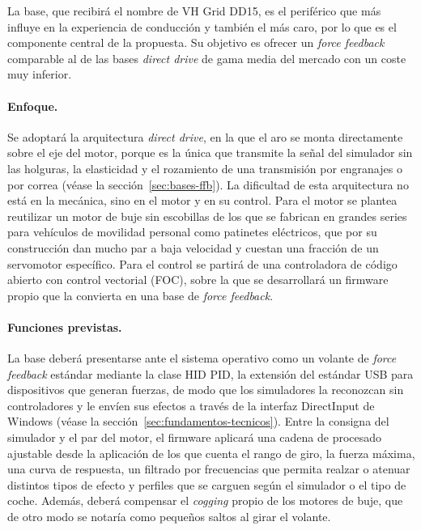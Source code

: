 La base, que recibirá el nombre de VH Grid DD15, es el periférico que más influye en la experiencia de conducción y también el más caro, por lo que es el componente central de la propuesta. Su objetivo es ofrecer un \textit{force feedback} comparable al de las bases \textit{direct drive} de gama media del mercado con un coste muy inferior.

\paragraph{Enfoque.}
Se adoptará la arquitectura \textit{direct drive}, en la que el aro se monta directamente sobre el eje del motor, porque es la única que transmite la señal del simulador sin las holguras, la elasticidad y el rozamiento de una transmisión por engranajes o por correa (véase la sección~\ref{sec:bases-ffb}). La dificultad de esta arquitectura no está en la mecánica, sino en el motor y en su control. Para el motor se plantea reutilizar un motor de buje sin escobillas de los que se fabrican en grandes series para vehículos de movilidad personal como patinetes eléctricos, que por su construcción dan mucho par a baja velocidad y cuestan una fracción de un servomotor específico. Para el control se partirá de una controladora de código abierto con control vectorial (FOC), sobre la que se desarrollará un firmware propio que la convierta en una base de \textit{force feedback}.

\paragraph{Funciones previstas.}
La base deberá presentarse ante el sistema operativo como un volante de \textit{force feedback} estándar mediante la clase HID PID, la extensión del estándar USB para dispositivos que generan fuerzas, de modo que los simuladores la reconozcan sin controladores y le envíen sus efectos a través de la interfaz DirectInput de Windows (véase la sección~\ref{sec:fundamentos-tecnicos}). Entre la consigna del simulador y el par del motor, el firmware aplicará una cadena de procesado ajustable desde la aplicación de los que cuenta el rango de giro, la fuerza máxima, una curva de respuesta, un filtrado por frecuencias que permita realzar o atenuar distintos tipos de efecto y perfiles que se carguen según el simulador o el tipo de coche. Además, deberá compensar el \textit{cogging} propio de los motores de buje, que de otro modo se notaría como pequeños saltos al girar el volante.

